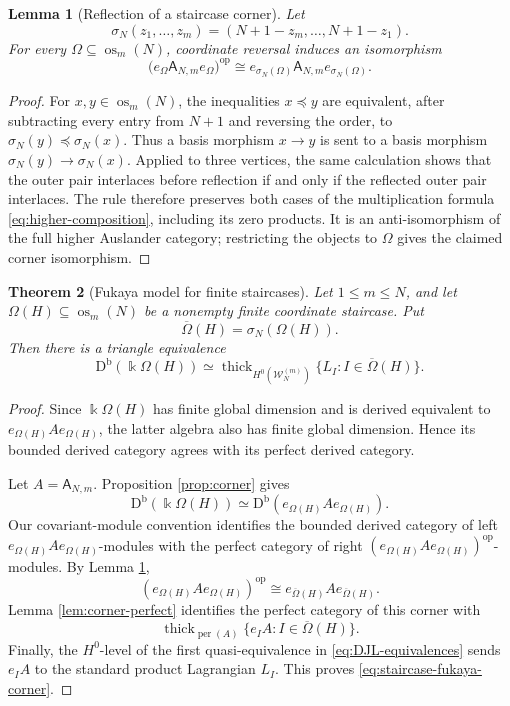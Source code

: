 \documentclass[12pt,a4paper,english,reqno]{amsart}
\theoremstyle{plain}
\newtheorem{theorem}{Theorem}[section]
\newtheorem{lemma}[theorem]{Lemma}
\theoremstyle{definition}
\newcommand{\kk}{\Bbbk}
\newcommand{\Db}{\mathrm D^{\mathrm b}}
\newcommand{\perf}{\operatorname{per}}
\newcommand{\thick}{\operatorname{thick}}
\newcommand{\op}{\mathrm{op}}
\newcommand{\os}{\operatorname{os}}
\newcommand{\Wcat}{\mathcal W}
\begin{document}
\begin{lemma}[Reflection of a staircase corner]
\label{lem:reflected-corner}
Let
\[
 \sigma_N(z_1,\ldots,z_m)
 =(N+1-z_m,\ldots,N+1-z_1).
\]
For every $\Omega\subseteq\os_m(N)$, coordinate reversal induces an isomorphism
\[
 \bigl(e_\Omega\mathsf A_{N,m}e_\Omega\bigr)^{\op}
 \cong
 e_{\sigma_N(\Omega)}\mathsf A_{N,m}
 e_{\sigma_N(\Omega)}.
\]
\end{lemma}

\begin{proof}
For $x,y\in\os_m(N)$, the inequalities $x\preceq y$ are equivalent,
after subtracting every entry from $N+1$ and reversing the order, to
$\sigma_N(y)\preceq\sigma_N(x)$.  Thus a basis morphism $x\to y$
is sent to a basis morphism
$\sigma_N(y)\to\sigma_N(x)$.  Applied to three vertices, the same
calculation shows that the outer pair interlaces before reflection if and
only if the reflected outer pair interlaces.  The rule therefore preserves
both cases of the multiplication formula
\eqref{eq:higher-composition}, including its zero products.  It is an
anti-isomorphism of the full higher Auslander category; restricting the
objects to $\Omega$ gives the claimed corner isomorphism.
\end{proof}

\begin{theorem}[Fukaya model for finite staircases]
\label{thm:staircase-fukaya-corner}
Let $1\leq m\leq N$, and let
$\Omega(H)\subseteq\os_m(N)$ be a nonempty finite coordinate staircase.
Put
\[
 \overline\Omega(H)=\sigma_N(\Omega(H)).
\]
Then there is a triangle equivalence
\begin{equation}
 \Db(\kk\Omega(H))
 \simeq
 \thick_{H^0(\Wcat_N^{(m)})}
 \{L_I:I\in\overline\Omega(H)\}.
\label{eq:staircase-fukaya-corner}
\end{equation}
\end{theorem}

\begin{proof}

Since $\kk\Omega(H)$ has finite global dimension and is derived equivalent
to $e_{\Omega(H)}Ae_{\Omega(H)}$, the latter algebra also has finite global
dimension. Hence its bounded derived category agrees with its perfect
derived category.

Let $A=\mathsf A_{N,m}$.  Proposition \ref{prop:corner} gives
\[
 \Db(\kk\Omega(H))
 \simeq
 \Db(e_{\Omega(H)}Ae_{\Omega(H)}).
\]
Our covariant-module convention identifies the bounded derived category of
left $e_{\Omega(H)}Ae_{\Omega(H)}$-modules with the perfect category of
right $(e_{\Omega(H)}Ae_{\Omega(H)})^{\op}$-modules.  By Lemma
\ref{lem:reflected-corner},
\[
 (e_{\Omega(H)}Ae_{\Omega(H)})^{\op}
 \cong
 e_{\overline\Omega(H)}Ae_{\overline\Omega(H)}.
\]
Lemma \ref{lem:corner-perfect} identifies the perfect category of this
corner with
\[
 \thick_{\perf(A)}
 \{e_IA:I\in\overline\Omega(H)\}.
\]
Finally, the $H^0$-level of the first quasi-equivalence in
\eqref{eq:DJL-equivalences} sends $e_IA$ to the standard product
Lagrangian $L_I$.  This proves \eqref{eq:staircase-fukaya-corner}.
\end{proof}
\end{document}
